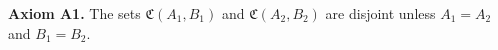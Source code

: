 \textbf{Axiom A1.} The sets $\mathfrak{C}(A_1, B_1)$ and $\mathfrak{C}(A_2, B_2)$ are disjoint unless $A_1 = A_2$ and $B_1 = B_2$.
